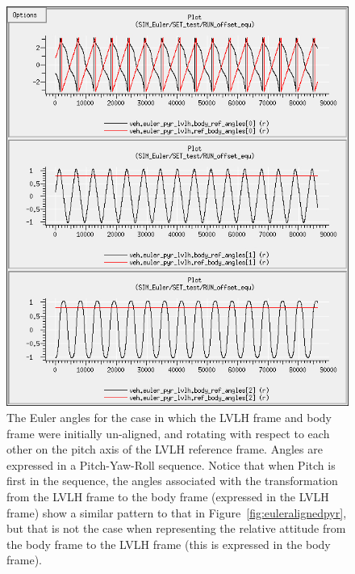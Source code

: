 \begin{description}
\begin{figure}[!ht]
\begin{center}
\includegraphics[width=5in]{figures/euler_nonaligned_pyr.jpg}
\caption{The Euler angles for the case in which the LVLH frame and body frame were initially un-aligned, and rotating with respect to each other on the pitch axis of the LVLH reference frame.  Angles are expressed in a Pitch-Yaw-Roll sequence.  Notice that when Pitch is first in the sequence, the angles associated with the transformation from the LVLH frame to the body frame (expressed in the LVLH frame) show a similar pattern to that in Figure~\ref{fig:euleralignedpyr}, but that is not the case when representing the relative attitude from the body frame to the LVLH frame (this is expressed in the body frame).}
\label{fig:eulernonalignedpyr}
\end{center}
\end{figure}


\end{description}
